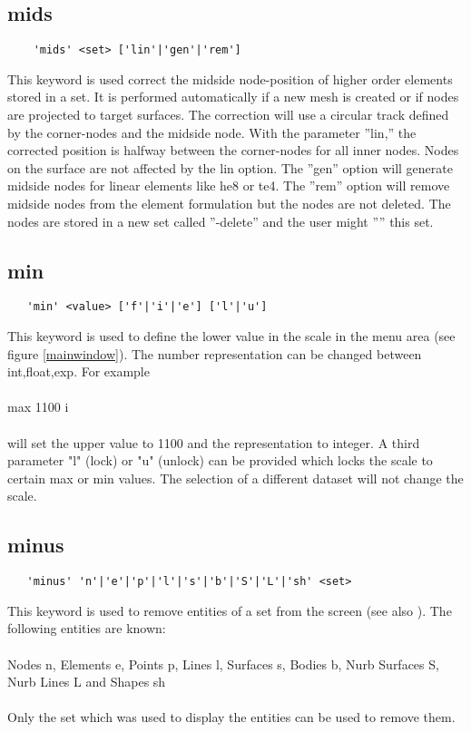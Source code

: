 \documentclass{article}
\begin{document}
\subsection{\label{mids}mids}
\begin{verbatim}
    'mids' <set> ['lin'|'gen'|'rem']
\end{verbatim}
This keyword is used correct the midside node-position of higher order elements stored in a set. It is performed automatically if a new mesh is created or if nodes are projected to target surfaces. The correction will use a circular track defined by the corner-nodes and the midside node. With the parameter ''lin,'' the corrected position is halfway between the corner-nodes for all inner nodes. Nodes on the surface are not affected by the lin option. The ''gen'' option will generate midside nodes for linear elements like he8 or te4. The ''rem'' option will remove midside nodes from the element formulation but the nodes are not deleted. The nodes are stored in a new set called ''-delete'' and the user might '''' this set. 

\subsection{\label{min}min}
\begin{verbatim}
   'min' <value> ['f'|'i'|'e'] ['l'|'u']
\end{verbatim}
This keyword is used to define the lower value in the scale in the menu area (see figure \ref{mainwindow}). The number representation can be changed between int,float,exp. For example\\\\max 1100 i\\\\will set the upper value to 1100 and the representation to integer. A third parameter "l" (lock) or "u" (unlock) can be provided which locks the scale to certain max or min values. The selection of a different dataset will not change the scale.
 
\subsection{\label{minus}minus}
\begin{verbatim}
   'minus' 'n'|'e'|'p'|'l'|'s'|'b'|'S'|'L'|'sh' <set> 
\end{verbatim}
This keyword is used to remove entities of a set from the screen (see also ). The following entities are known:\\\\
Nodes n, Elements e, Points p, Lines l, Surfaces s, Bodies b, Nurb Surfaces S, Nurb Lines L and Shapes sh\\\\Only the set which was used to display the entities can be used to remove them.
 
\end{document}
